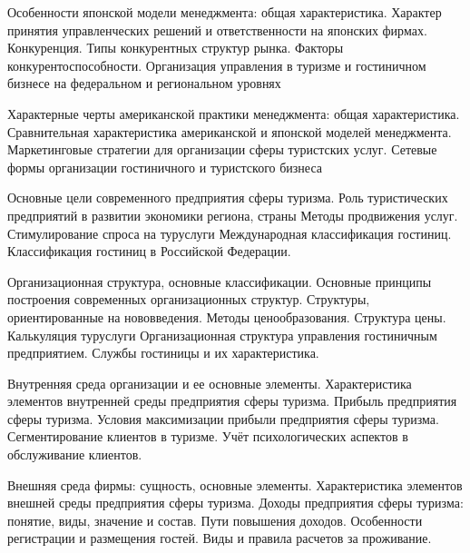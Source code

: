 \documentclass[
	11pt,
	a4paper,
	]
	{article}
\begin{document}
\bigskip

\noindent{} 
	{
		Особенности японской модели менеджмента: общая характеристика. Характер принятия управленческих решений и ответственности на японских фирмах.
	}{
		Конкуренция. Типы конкурентных структур рынка. Факторы конкурентоспособности.
	}{
		Организация управления в туризме и гостиничном бизнесе на федеральном и региональном уровнях
	}

\bigskip

\noindent{} 
	{
		Характерные черты американской практики менеджмента: общая характеристика. Сравнительная характеристика американской и японской моделей менеджмента.
	}{
		Маркетинговые стратегии для организации сферы туристских услуг.
	}{
		Сетевые формы организации гостиничного и туристского бизнеса
	}

\bigskip

\noindent{} 
	{
		Основные цели современного предприятия сферы туризма. Роль туристических предприятий в развитии экономики региона, страны
	}{
		Методы продвижения услуг. Стимулирование спроса на туруслуги
	}{
		Международная классификация гостиниц. Классификация гостиниц в Российской Федерации.
	}

\bigskip

\noindent{} 
	{
		Организационная структура, основные классификации. Основные принципы построения современных организационных структур. Структуры, ориентированные на нововведения.
	}{
		Методы ценообразования. Структура цены. Калькуляция туруслуги
	}{
		Организационная структура управления гостиничным предприятием. Службы гостиницы и их характеристика.
	}

\bigskip

\noindent{} 
	{
		Внутренняя среда организации и ее основные элементы. Характеристика элементов внутренней среды предприятия сферы туризма.
	}{
		Прибыль предприятия сферы туризма. Условия максимизации прибыли предприятия сферы туризма.
	}{
		Сегментирование клиентов в туризме. Учёт психологических аспектов в обслуживание клиентов.
	}

\bigskip

\noindent{} 
	{
		Внешняя среда фирмы: сущность, основные элементы. Характеристика элементов внешней среды предприятия сферы туризма.
	}{
		Доходы предприятия сферы туризма: понятие, виды, значение и состав. Пути повышения доходов.
	}{
		Особенности регистрации и размещения гостей. Виды и правила расчетов за проживание.
	}

\bigskip
\end{document}
